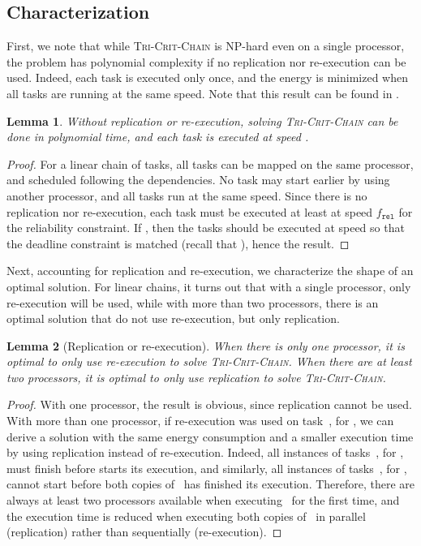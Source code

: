 \documentclass[a4paper]{article}
\theoremstyle{plain}
\newtheorem{lemma}{Lemma}
\theoremstyle{definition}
\theoremstyle{remark}
\newcommand{\fr}{\ensuremath{f_{\texttt{rel}}}\xspace}
\newcommand{\chain}{\textsc{Tri-Crit-Chain}\xspace}
\begin{document}
\subsection{Characterization}
\label{lin.char}


First, we note that while \chain is NP-hard even on a single
processor, the problem has polynomial complexity if no replication nor
re-execution can be used. Indeed, each task is executed only once, and
the energy is minimized when all tasks are running at the same speed. 
Note that this result can be found in \cite{aupy12ccpe}. 
\begin{lemma}
  \label{lemma_norel}
  Without replication or re-execution, solving \chain can be done 
  in polynomial time, and each task is
  executed at speed  . 
\end{lemma}
\begin{proof}
  For a linear chain of tasks, all tasks can be mapped on the same
  processor, and scheduled following the dependencies. No task may
  start earlier by using another processor, and all tasks run at the
  same speed. Since there is no replication nor re-execution, each
  task must be executed at least at speed \fr for the reliability
  constraint. If , then the tasks should be executed at speed
   so that the deadline constraint is matched (recall that
  ), hence the result. 
\end{proof}

Next, accounting for replication and re-execution, we characterize the
shape of an optimal solution. For linear chains, it turns out that
with a single processor, only re-execution will be used, while with
more than two processors, there is an optimal solution that do not use
re-execution, but only replication. 
\begin{lemma}[Replication or re-execution]
  \label{chain_reporreex}
  When there is only one processor, it is optimal to only use
  re-execu\-tion to solve \chain.  When there are
  at least two processors, it is optimal to only use replication to
  solve \chain.
\end{lemma}

\begin{proof}
  With one processor, the result is obvious, since replication cannot
  be used. With more than one processor, if re-execution was used on
  task~, for , we can derive a solution with the
  same energy consumption and a smaller execution time by using
  replication instead of re-execution. Indeed, all instances of
  tasks~, for , must finish before  starts its
  execution, and similarly, all instances of tasks~, for ,
  cannot start before both copies of~ has finished its
  execution. Therefore, there are always at least two processors
  available when executing~ for the first time, and the execution
  time is reduced when executing both copies of~ in parallel
  (replication) rather than sequentially (re-execution). 
\end{proof}
\end{document}
